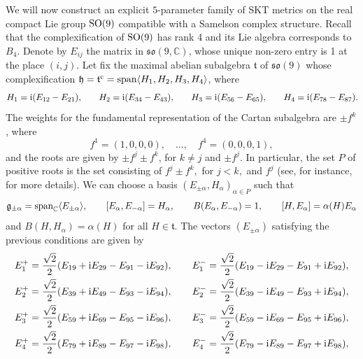\documentclass[10pt,a4paper]{amsart}
\numberwithin{equation}{section}
\begin{document}
\begin{Example} We will now construct an explicit $5$-parameter family of SKT metrics on the real compact Lie group ${\rm SO}(9)$ compatible with a Samelson complex structure. Recall that the complexification of ${\rm SO}(9)$ has rank 4 and its Lie algebra corresponds to $B_4$. Denote by $E_{ij}$ the matrix in ${\mathfrak {so}}(9, \mathbb C)$, whose unique non-zero entry is 1 at the place $(i,j)$. Let fix the maximal abelian subalgebra $\mathfrak t$ of ${\mathfrak {so}} (9)$ whose complexification $\mathfrak h= \mathfrak t ^{\rm c} = \operatorname{span} \langle H_1, H_2, H_3, H_4\rangle$, where
\begin{gather*}
H_1 = {\rm i} (E_{12} - E_{21}), \qquad\! H_2 = {\rm i} (E_{34} - E_{43}), \qquad\! H_3 = {\rm i} (E_{56} - E_{65}), \qquad\! H_4 = {\rm i} (E_{78} - E_{87}).\!
\end{gather*}
The weights for the fundamental representation of the Cartan subalgebra are $\pm f^k$, where
\[
f^1 = (1,0,0,0), \quad\dots,\quad f^4 = (0,0,0,1),
\]
 and the roots are given by $\pm f^j \pm f^k$, for $k \neq j$ and $\pm f^j$. In particular, the set $P$ of positive roots is the set consisting of $ f^j \pm f^k ,$ for $ j < k,$ and $f^j$ (see, for instance, \cite{St} for more details). We can choose a basis $(E_{\pm \alpha}, H_{\alpha})_{\alpha \in P}$ such that
 \[
 \mathfrak g_{\pm \alpha}= {\rm {span}}_{\mathbb C} \langle E_{\pm\alpha}\rangle, \qquad [E_{\alpha}, E_{-\alpha}]=H_{\alpha}, \qquad B(E_{\alpha}, E_{-\alpha}) = 1, \qquad [H, E_{\alpha}] = \alpha(H)E_{\alpha}
 \]
 and $B(H, H_{\alpha}) = \alpha(H)$ for all $H \in \mathfrak t$. The vectors $(E_{ \pm \alpha})$ satisfying the previous conditions are given by
\begin{gather*}
E_1^+ = \frac{\sqrt{2}}{2} (E_{19} + {\rm i} E_{29} - E_{91} - {\rm i} E_{92}), \qquad E_1^- = \frac{\sqrt{2}}{2} (E_{19} - {\rm i} E_{29} - E_{91}+ {\rm i} E_{92}),\\
E_2^+ = \frac{\sqrt{2}}{2} (E_{39} + {\rm i} E_{49} - E_{93} - {\rm i} E_{94}), \qquad E_2^- = \frac{\sqrt{2}}{2} (E_{39} - {\rm i} E_{49} - E_{93} + {\rm i} E_{94}),\\
E_3^+ = \frac{\sqrt{2}}{2} (E_{59} + {\rm i} E_{69} - E_{95} - {\rm i} E_{96}), \qquad E_3^- = \frac{\sqrt{2}}{2} (E_{59} - {\rm i} E_{69} - E_{95} + {\rm i} E_{96}),\\
E_4^+ = \frac{\sqrt{2}}{2} (E_{79} + {\rm i} E_{89} - E_{97} - {\rm i} E_{98}), \qquad E_4^- = \frac{\sqrt{2}}{2} (E_{79} - {\rm i} E_{89} - E_{97} + {\rm i} E_{98}),\\

\end{gather*}
\end{Example}
\end{document}
